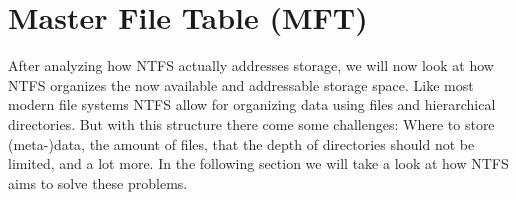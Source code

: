 \section{Master File Table (MFT)}
\label{sec:MFT}
After analyzing how NTFS actually addresses storage, we will now look at how NTFS organizes the now available and addressable storage space. Like most modern file systems NTFS allow for organizing data using files and hierarchical directories. But with this structure there come some challenges: Where to store (meta-)data, the amount of files, that the depth of directories should not be limited, and a lot more. In the following section we will take a look at how NTFS aims to solve these problems.\\


